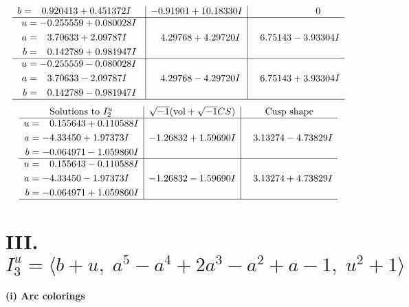 \documentclass[1p]{elsarticle_modified}
\theoremstyle{definition}
\newcommand{\I}{\sqrt{-1}}
\begin{document}
$$\begin{array}{c|c|c}
\begin{aligned}
b &= \phantom{-}0.920413 + 0.451372 I\end{aligned}
 & -0.91901 + 10.18330 I & \phantom{-0.000000 } 0 \\ \hline\begin{aligned}
u &= -0.255559 + 0.080028 I \\
a &= \phantom{-}3.70633 + 2.09787 I \\
b &= \phantom{-}0.142789 + 0.981947 I\end{aligned}
 & \phantom{-}4.29768 + 4.29720 I & \phantom{-}6.75143 - 3.93304 I \\ \hline\begin{aligned}
u &= -0.255559 - 0.080028 I \\
a &= \phantom{-}3.70633 - 2.09787 I \\
b &= \phantom{-}0.142789 - 0.981947 I\end{aligned}
 & \phantom{-}4.29768 - 4.29720 I & \phantom{-}6.75143 + 3.93304 I\\
 \hline 
 \end{array}$$\newpage$$\begin{array}{c|c|c}  
\text{Solutions to }I^u_{2}& \I (\text{vol} + \sqrt{-1}CS) & \text{Cusp shape}\\
 \hline 
\begin{aligned}
u &= \phantom{-}0.155643 + 0.110588 I \\
a &= -4.33450 + 1.97373 I \\
b &= -0.064971 - 1.059860 I\end{aligned}
 & -1.26832 + 1.59690 I & \phantom{-}3.13274 - 4.73829 I \\ \hline\begin{aligned}
u &= \phantom{-}0.155643 - 0.110588 I \\
a &= -4.33450 - 1.97373 I \\
b &= -0.064971 + 1.059860 I\end{aligned}
 & -1.26832 - 1.59690 I & \phantom{-}3.13274 + 4.73829 I\\
 \hline 
 \end{array}$$\newpage\newpage\renewcommand{\arraystretch}{1}
\centering \section*{III. $I^u_{3}= \langle b+u,\;a^5- a^4+2 a^3- a^2+a-1,\;u^2+1 \rangle$}
\flushleft \textbf{(i) Arc colorings}\\
\end{document}
